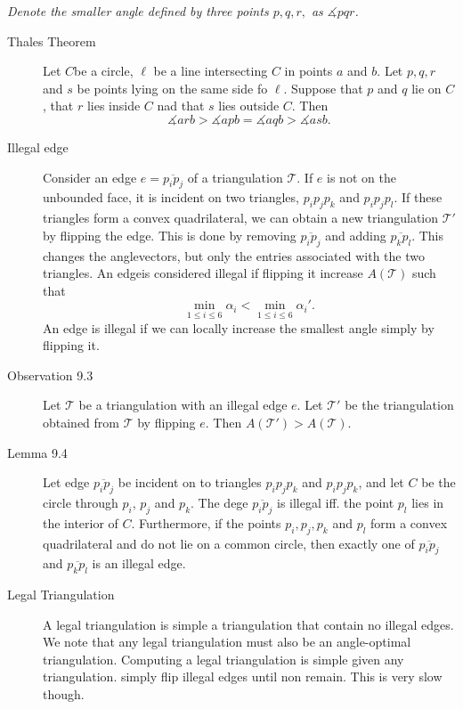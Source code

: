 \textit{Denote the smaller angle defined by three points $p,q,r,$ as
  $\measuredangle pqr$.}

\begin{description}
\item[Thales Theorem] Let $C$be a circle, $\ell$ be a line intersecting $C$ in
  points $a$ and $b$. Let $p, q, r$ and $s$ be points lying on the same side fo
  $\ell$. Suppose that $p$ and $q$ lie on $C$, that $r$ lies inside $C$ nad that
  $s$ lies outside $C$.  Then
  \[
    \measuredangle arb > \measuredangle apb = \measuredangle aqb > \measuredangle asb.
  \]

\item[Illegal edge] Consider an edge $e = \overline{p_ip_j}$ of a triangulation
  $\mathcal{T}$. If $e$ is not on the unbounded face, it is incident on two
  triangles, $p_ip_jp_k$ and $p_ip_jp_l$. If these triangles form a convex
  quadrilateral, we can obtain a new triangulation $\mathcal{T}'$ by flipping
  the edge. This is done by removing $\overline{p_ip_j}$ and adding
  $\overline{p_kp_l}$. This changes the anglevectors, but only the entries
  associated with the two triangles.  An edgeis considered illegal if flipping
  it increase $A(\mathcal{T})$ such that
  \[
    \underset{1\leq i \leq 6}{\min} \alpha_i < \underset{1\leq i\leq 6}{\min} \alpha_i'.
  \]
  An edge is illegal if we can locally increase the smallest angle simply by flipping it.

\item[Observation 9.3] Let $\mathcal{T}$ be a triangulation with an illegal edge
  $e$. Let $\mathcal{T}'$ be the triangulation obtained from $\mathcal{T}$ by
  flipping $e$. Then $A(\mathcal{T}') > A(\mathcal{T})$.

\item[Lemma 9.4] Let edge $\overline{p_ip_j}$ be incident on to triangles
  $p_ip_jp_k$ and $p_ip_jp_k$, and let $C$ be the circle through $p_i$, $p_j$
  and $p_k$. The dege $\overline{p_ip_j}$ is illegal iff. the point $p_l$ lies
  in the interior of $C$.  Furthermore, if the points $p_i, p_j, p_k$ and $p_l$
  form a convex quadrilateral and do not lie on a common circle, then exactly one
  of $\overline{p_ip_j}$ and $\overline{p_kp_l}$ is an illegal edge.

\item[Legal Triangulation] A legal triangulation is simple a triangulation that
  contain no illegal edges. We note that any legal triangulation must also be an
  angle-optimal triangulation. Computing a legal triangulation is simple given
  any triangulation.  simply flip illegal edges until non remain. This is very
  slow though.
\end{description}



